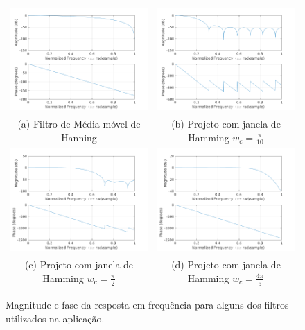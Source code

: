 \begin{figure}[!hbt]
\centering
\begin{tabular}{cc}
\includegraphics[width=0.45\linewidth]{figs/filter-response-hanningFilter.png} &
\includegraphics[width=0.45\linewidth]{figs/filter-response-wc_0_1pi.png}\\
(a) Filtro de Média móvel de Hanning & (b) Projeto com janela de Hamming $w_c=\frac{\pi}{10}$ \\
\includegraphics[width=0.45\linewidth]{figs/filter-response-wc_0_5pi.png} &
\includegraphics[width=0.45\linewidth]{figs/filter-response-wc_0_8pi.png} \\
(c) Projeto com janela de Hamming $w_c=\frac{\pi}{2}$ & (d) Projeto com janela de Hamming $w_c=\frac{4\pi}{5}$ \\
\end{tabular}

\caption{Magnitude e fase da resposta em frequência para alguns dos filtros
utilizados na aplicação.}

\label{fig:filter-design-frequency-response}
\end{figure}

